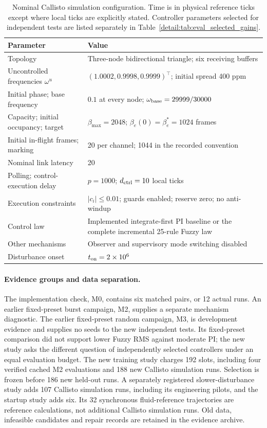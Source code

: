 \begin{table}[t]
\caption{Nominal Callisto simulation configuration. Time is in physical reference
ticks except where local ticks are explicitly stated. Controller parameters
selected for independent tests are listed separately in
Table~\ref{detail:tab:eval_selected_gains}.}
\label{detail:tab:eval_setup}
\centering
\begin{tabular}{@{}ll@{}}\toprule
Parameter & Value\\\midrule
Topology & Three-node bidirectional triangle; six receiving buffers\\
Uncontrolled frequencies $\omega^u$ & $(1.0002,0.9998,0.9999)^\top$; initial spread 400 ppm\\
Initial phase; base frequency & $0.1$ at every node; $\omega_{\rm base}=29999/30000$\\
Capacity; initial occupancy; target & $\beta_{\max}=2048$; $\beta_e(0)=\beta_e^*=1024$ frames\\
Initial in-flight frames; marking & 20 per channel; 1044 in the recorded convention\\
Nominal link latency & 20\\
Polling; control-execution delay & $p=1000$; $d_{\rm ctrl}=10$ local ticks\\
Execution constraints & $|c_i|\le0.01$; guards enabled; reserve zero; no anti-windup\\
Control law & Implemented integrate-first PI baseline or the complete incremental 25-rule Fuzzy law\\
Other mechanisms & Observer and supervisory mode switching disabled\\
Disturbance onset & $t_{\rm on}=2\times10^6$\\\bottomrule
\end{tabular}
\end{table}

\paragraph{Evidence groups and data separation.}
The implementation check, M0, contains six matched pairs, or 12 actual
runs. An earlier fixed-preset burst campaign, M2, supplies a separate
mechanism diagnostic. The earlier fixed-preset random campaign, M3, is
development evidence and supplies no seeds to the new independent tests.
Its fixed-preset comparison did not support lower Fuzzy RMS against
moderate PI; the new study asks the different question of independently
selected controllers under an equal evaluation budget.
The new training study charges 192 slots, including four verified cached
M2 evaluations and 188 new Callisto simulation runs. Selection is frozen before 186
new held-out runs. A separately registered slower-disturbance study adds
107 Callisto simulation runs, including its engineering pilots, and the startup
study adds six. Its 32 synchronous fluid-reference trajectories are
reference calculations, not additional Callisto simulation runs. Old data, infeasible
candidates and repair records are retained in the evidence archive.

